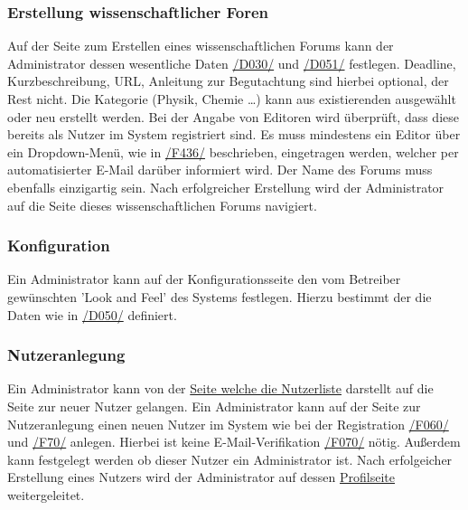 \subsubsection{Erstellung wissenschaftlicher Foren}
\begin{description}
     Auf der Seite zum Erstellen eines wissenschaftlichen Forums kann der Administrator dessen
    wesentliche Daten \hyperref[d030]{/D030/} und \hyperref[d051]{/D051/}
    festlegen. Deadline, Kurzbeschreibung, URL, Anleitung zur Begutachtung sind hierbei optional, der Rest nicht.
    Die Kategorie (Physik, Chemie \ldots) kann aus existierenden ausgewählt oder neu erstellt werden.
    Bei der Angabe von Editoren wird überprüft, dass diese bereits als Nutzer im System registriert sind.
    Es muss mindestens ein Editor über ein Dropdown-Menü, wie in \hyperref[funkt:436]{/F436/} beschrieben, eingetragen werden,
    welcher per automatisierter E-Mail darüber informiert wird.
    Der Name des Forums muss ebenfalls einzigartig sein.
    Nach erfolgreicher Erstellung wird der Administrator auf die Seite dieses wissenschaftlichen Forums
    navigiert.
\end{description}

\subsubsection{Konfiguration}
\begin{description}
     Ein Administrator kann auf der Konfigurationsseite den vom Betreiber gewünschten
    'Look and Feel' des Systems festlegen. Hierzu bestimmt der die Daten wie in \hyperref[d050]{/D050/} definiert.
\end{description}

\subsubsection{Nutzeranlegung}
\begin{description}
     Ein Administrator kann von der \hyperref[ed:benutzer]{Seite welche die Nutzerliste} darstellt auf die Seite zur
    neuer Nutzer gelangen.
     Ein Administrator kann auf der Seite zur Nutzeranlegung
    einen neuen Nutzer im System wie bei der Registration \hyperref[funkt:060]{/F060/} und \hyperref[funkt:070]{/F70/}
    anlegen. Hierbei ist keine E-Mail-Verifikation \hyperref[funkt:070]{/F070/} nötig. Außerdem kann festgelegt werden ob dieser Nutzer ein Administrator ist.
     Nach erfolgeicher Erstellung eines Nutzers wird der Administrator auf dessen \hyperref[ad:profil]{Profilseite} weitergeleitet.
\end{description}